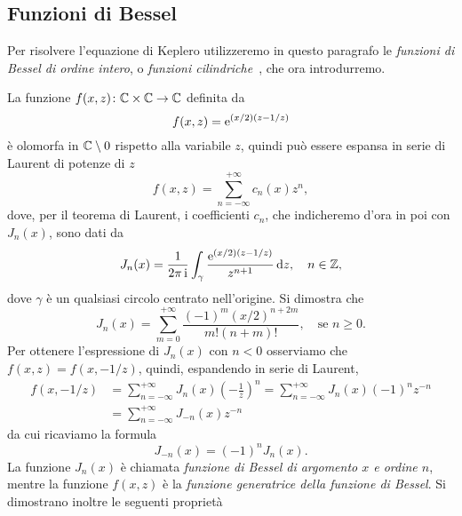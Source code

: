 \subsection{Funzioni di Bessel}
\label{sec:bessel}

Per risolvere l'equazione di Keplero utilizzeremo in questo paragrafo le
\emph{funzioni di Bessel di ordine intero}, o \emph{funzioni
  cilindriche}~\cites[355]{abramowitz:handbook}[355]{whittaker:modern-analysis},
che ora introdurremo.

La funzione $f(x,z)\colon\mathbb{C}\times\mathbb{C}\to\mathbb{C}$ definita da
\begin{equation}
  f(x,z) = \operatorname{\mathrm{e}}^{(x/2)(z - 1/z)}
\end{equation}
è olomorfa in $\mathbb{C}\setminus 0$ rispetto alla variabile $z$, quindi può essere
espansa in serie di Laurent di potenze di $z$
\begin{equation}
  f(x,z) = \sum_{n = -\infty}^{+\infty} c_n(x) z^n,
\end{equation}
dove, per il teorema di Laurent, i coefficienti $c_n$, che indicheremo d'ora in
poi con $J_n(x)$, sono dati da
\begin{equation}
  J_n(x) = \frac{1}{2\pi\operatorname{\mathrm{i}}}\int_\gamma \frac{\operatorname{\mathrm{e}}^{(x/2)(z-1/z)}}{z^{n+1}}\mathop{}\!\mathrm{d} z,
  \quad n\in\mathbb{Z},
\end{equation}
dove $\gamma$ è un qualsiasi circolo centrato nell'origine. Si dimostra che
\begin{equation}
  J_n (x) = \sum_{m = 0}^{+\infty}\frac{(-1)^m(x/2)^{n+2m}}{m!(n+m)!}, \quad
  \text{se $n\geq 0$}.
\end{equation}
Per ottenere l'espressione di $J_n(x)$ con $n < 0$ osserviamo che $f(x,z) =
f(x,-1/z)$, quindi, espandendo in serie di Laurent,
\begin{equation}
  \begin{split}
    f(x,-1/z) &= \sum_{n = -\infty}^{+\infty}J_n(x)
    \left(
      -\frac{1}{z}
    \right)^n = \sum_{n = -\infty}^{+\infty}J_n(x)(-1)^nz^{-n} \\
    &= \sum_{n = -\infty}^{+\infty}J_{-n}(x)z^{-n}
  \end{split}
\end{equation}
da cui ricaviamo la formula
\begin{equation}
  J_{-n}(x) = (-1)^nJ_n(x).
\end{equation}
La funzione $J_n(x)$ è chiamata \emph{funzione di Bessel di argomento $x$ e
  ordine $n$}, mentre la funzione $f(x,z)$ è la \emph{funzione generatrice della
  funzione di Bessel}. Si dimostrano inoltre le seguenti proprietà
